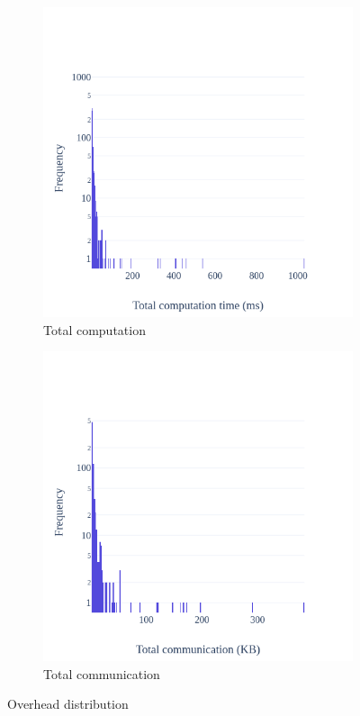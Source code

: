 \documentclass[USenglish,oneside,twocolumn]{article}
\begin{document}
\begin{figure}[t]
\begin{subfigure}[b]{0.3\textwidth}
        \includegraphics[width=\textwidth]{graphics/pl-cpuover.png}
        \caption{Total computation}
        \label{fig:cpuover}
    \end{subfigure}
    \begin{subfigure}[b]{0.3\textwidth}
        \includegraphics[width=\textwidth]{graphics/pl-commover.png}
        \caption{Total communication}
        \label{fig:commover}
    \end{subfigure}
    \caption{Overhead distribution}
\end{figure}
\end{document}
